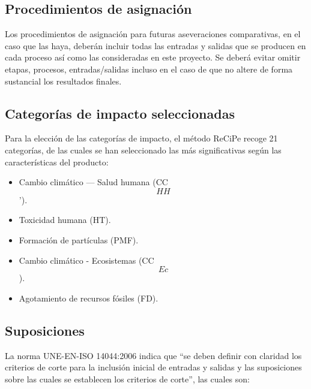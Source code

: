 \subsection{Procedimientos de asignación}
Los procedimientos de asignación para futuras aseveraciones comparativas, en el caso que las haya, deberán incluir todas las entradas y salidas que se producen en cada proceso así como las consideradas en este proyecto. Se deberá evitar omitir etapas, procesos, entradas/salidas incluso en el caso de que no altere de forma sustancial los resultados finales.

\subsection{Categorías de impacto seleccionadas}\label{sec:categoriasimpactoseleccionadas}

Para la elección de las categorías de impacto, el método ReCiPe recoge 21 categorías, de las cuales se han seleccionado las más significativas según las características del producto:

\begin{itemize}
  \item Cambio climático — Salud humana (CC\[HH\]').
  \item Toxicidad humana (HT).
  \item Formación de partículas (PMF).
  \item Cambio climático - Ecosistemas (CC\[Ec\]).
  \item Agotamiento de recursos fósiles (FD).
\end{itemize}

\subsection{Suposiciones}
La norma UNE-EN-ISO 14044:2006 \cite{iso14044} indica que ``se deben definir con claridad los criterios de corte para la inclusión inicial de entradas y salidas y las suposiciones sobre las cuales se establecen los criterios de corte'', las cuales son:

